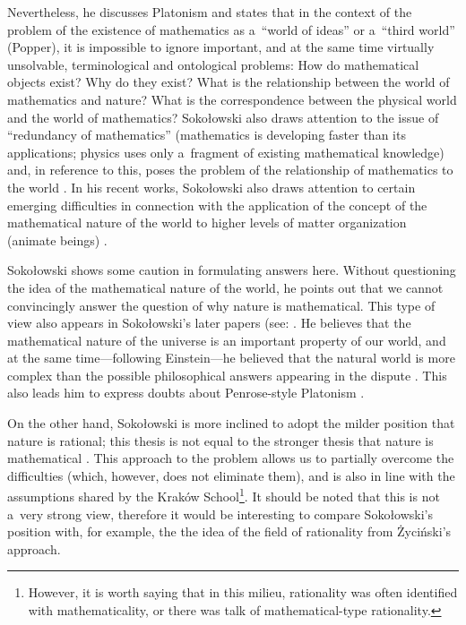 \documentclass[%
  manuscript=article,
  year=2024,
  volume=77,
  doi=10.59203/zfn.77.689,
]{zfn}
\begin{document}
Nevertheless, he discusses Platonism and states that in the context of the problem of the existence of mathematics as a~``world of ideas'' or a~``third world'' (Popper), it is impossible to ignore important, and at the same time virtually unsolvable, terminological and ontological problems: How do mathematical objects exist? Why do they exist? What is the relationship between the world of mathematics and nature? What is the correspondence between the physical world and the world of mathematics? Sokołowski also draws attention to the issue of ``redundancy of mathematics'' (mathematics is developing faster than its applications; physics uses only a~fragment of existing mathematical knowledge) and, in reference to this, poses the problem of the relationship of mathematics to the world 
\parencite[][pp.217–220]{Sokoowski2011Pare}. %
 In his recent works, Sokołowski also draws attention to certain emerging difficulties in connection with the application of the concept of the mathematical nature of the world to higher levels of matter organization (animate beings)
\parencite[][p.74]{Sokoowski2015Co}.%




Sokołowski shows some caution in formulating answers here. Without questioning the idea of the mathematical nature of the world, he points out that we cannot convincingly answer the question of why nature is mathematical. This type of view also appears in Sokołowski's later papers (see: 
\parencite[][p.65]{Sokoowski2015Co}. %
 He believes that the mathematical nature of the universe is an important property of our world, and at the same time---following Einstein---he believed that the natural world is more complex than the possible philosophical answers appearing in the dispute 
\parencites[][pp.190–191]{Sokoowski1987Alberta}[][p.67]{Sokoowski2015Co}. %
 This also leads him to express doubts about Penrose-style Platonism 
\parencite[][p.218]{Sokoowski2011Pare}.%




On the other hand, Sokołowski is more inclined to adopt the milder position that nature is rational; this thesis is not equal to the stronger thesis that nature is mathematical 
\parencite[][p.215]{Sokoowski2001Wspoczesne}. %
 This approach to the problem allows us to partially overcome the difficulties (which, however, does not eliminate them), and is also in line with the assumptions shared by the Kraków School\footnote{However, it is worth saying that in this milieu, rationality was often identified with mathematicality, or there was talk of mathematical-type rationality.}. It should be noted that this is not a~very strong view, therefore it would be interesting to compare Sokołowski's position with, for example, the the idea of the field of rationality from Życiński's approach.
\end{document}

